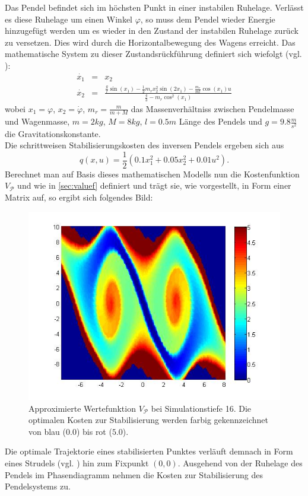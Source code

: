 \documentclass[12pt,a4paper,twoside]{article}
\begin{document}
	Das Pendel befindet sich im höchsten Punkt in einer instabilen Ruhelage. Verlässt es diese Ruhelage um einen 
	Winkel $\varphi$, so muss dem Pendel wieder Energie hinzugefügt werden um es wieder in den Zustand der instabilen 
	Ruhelage zurück zu versetzen. Dies wird durch die Horizontalbewegung des Wagens erreicht. Das mathematische System zu dieser Zustandsrückführung definiert sich 
	wiefolgt (vgl. \citep{Grune2005}):
	\begin{eqnarray}
		\dot{x_1} &=& x_2 \\
		\dot{x_2} &=& \frac{\frac{g}{l}\sin (x_1)-\frac{1}{2}m_rx_2^2\sin (2x_1)-\frac{m_r}{ml}\cos (x_1)u}{\frac{4}{3}-m_r\cos ^2(x_1)}
	\end{eqnarray}
	wobei $x_1=\varphi$, $x_2=\dot{\varphi}$, $m_r=\frac{m}{m+M}$ das Massenverhältniss zwischen Pendelmasse und 
	Wagenmasse, $m=2kg$, $M=8kg$, $l=0.5m$ Länge des Pendels und $g=9.8\frac{m}{s^2}$ die Gravitationskonstante. \\
	Die schrittweisen Stabilisierungskosten des inversen Pendels ergeben sich aus
	\begin{equation}
		q(x,u)=\frac{1}{2}(0.1x_1^2+0.05x_2^2+0.01u^2).
	\end{equation}
	Berechnet man auf Basis dieses mathematischen Modells nun die Kostenfunktion $V_\mathcal{P}$ und wie in 
	\ref{sec:valuef} definiert und trägt sie, wie vorgestellt, in Form einer Matrix auf, so ergibt sich folgendes 
	Bild:
	\begin{figure}[h]
		\center
		\includegraphics[scale=0.55]{valuefunction_plot_256.jpg}
		\caption{\label{pic:Vapp}Approximierte Wertefunktion $V_\mathcal{P}$ bei Simulationstiefe 16. Die optimalen Kosten zur Stabilisierung werden farbig gekennzeichnet von blau ($0.0$) bis rot ($5.0$).}
	\end{figure}
	\newline
	Die optimale Trajektorie eines stabilisierten Punktes verläuft demnach in Form eines Strudels (vgl. \citep{Grune2005}) hin zum Fixpunkt $(0,0)$.
	Ausgehend von der Ruhelage des Pendels im Phasendiagramm nehmen die Kosten zur Stabilisierung 
	des Pendelsystems zu.
	\newpage
\end{document}
